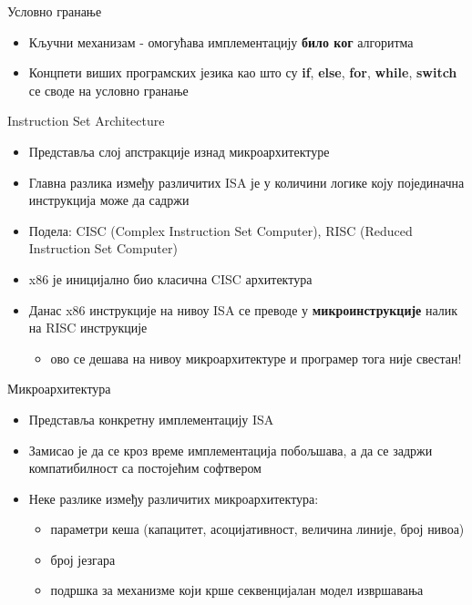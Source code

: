 \documentclass[xcolor=table]{beamer}
\begin{document}
    \begin{frame}{Условно гранање}
        \begin{itemize}
            \item Кључни механизам - омогућава имплементацију \textbf{било ког} алгоритма
            \item Концпети виших програмских језика као што су \textbf{if}, \textbf{else}, \textbf{for}, \textbf{while}, \textbf{switch} се своде на условно гранање
        \end{itemize}
    \end{frame}
    
    \begin{frame}{Instruction Set Architecture}
        \begin{itemize}
            \item Представља слој апстракције изнад микроархитектуре
            \item Главна разлика између различитих ISA је у количини логике коју појединачна инструкција може да садржи
            \item Подела: CISC (Complex Instruction Set Computer), RISC (Reduced Instruction Set Computer)
            \item x86 је иницијално био класична CISC архитектура
            \item Данас x86 инструкције на нивоу ISA се преводе у \textbf{микроинструкције} налик на RISC инструкције
            \begin{itemize}
                \item ово се дешава на нивоу микроархитектуре и програмер тога није свестан!
            \end{itemize}
        \end{itemize}
    \end{frame}
    
    \begin{frame}{Микроархитектура}
        \begin{itemize}
            \item Представља конкретну имплементацију ISA
            \item Замисао је да се кроз време имплементација побољшава, а да се задржи компатибилност са постојећим софтвером
            \item Неке разлике између различитих микроархитектура:
            \begin{itemize}
                \item параметри кеша (капацитет, асоцијативност, величина линије, број нивоа)
                \item број језгара
                \item подршка за механизме који крше секвенцијалан модел извршавања
            \end{itemize}
        \end{itemize}
    \end{frame}
    
\end{document}
